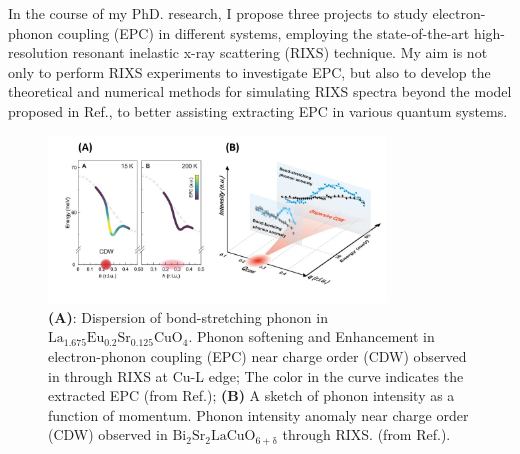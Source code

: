 \documentclass[11pt]{article}
\begin{document}
In the course of my PhD. research, I propose three projects to study electron-phonon coupling (EPC) in different systems, employing the state-of-the-art high-resolution resonant inelastic x-ray scattering (RIXS) technique\cite{ament_resonant_2011,zhou_i21_2022}. 
My aim is not only to perform RIXS experiments to investigate EPC, but also to develop the theoretical and numerical methods for simulating RIXS spectra beyond the model proposed in Ref.\cite{ament_determining_2011}, to better assisting extracting EPC in various quantum systems.
\begin{figure}[!t]
    \centering
    \includegraphics[width=0.8\textwidth]{figures/new_first_figure.jpg}
    \caption{\textbf{(A)}: Dispersion of bond-stretching phonon in $\mathrm{La_{1.675}Eu_{0.2}Sr_{0.125}CuO_{4}}$. Phonon softening and Enhancement in electron-phonon coupling (EPC) near charge order (CDW) observed in  through RIXS at Cu-L edge; The color in the curve indicates the extracted EPC (from Ref.\cite{wang_charge_2021}); \textbf{(B)} A sketch of phonon intensity as a function of momentum. Phonon intensity anomaly near charge order (CDW) observed in $\mathrm{Bi_2Sr_2LaCuO_{6+\delta}}$ through RIXS.  (from Ref.\cite{li_multiorbital_2020}).}  
    \label{first_figure}
\end{figure}
\end{document}
